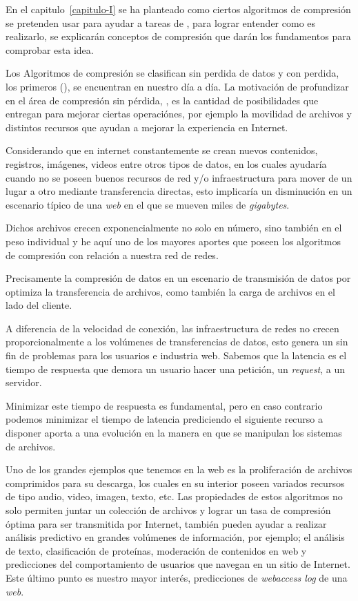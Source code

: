 

En el capitulo~\ref{capitulo-I} se ha planteado como ciertos algoritmos de compresión se pretenden usar para ayudar a tareas de \machinelearning, para lograr entender como es realizarlo, se explicarán conceptos de compresión que darán los fundamentos para comprobar esta idea.



Los Algoritmos de compresión se clasifican sin perdida de datos y con perdida, los primeros \losslessdatacompression(\LDC), se encuentran en nuestro día a día. La motivación de profundizar en el área de compresión sin pérdida, \LDC, es la cantidad de posibilidades que entregan para mejorar ciertas  operaciónes, por ejemplo la  movilidad de archivos y distintos recursos que ayudan a mejorar la experiencia en Internet. 


Considerando que en internet constantemente se crean nuevos contenidos, registros, imágenes, videos entre otros tipos de datos, en los cuales ayudaría cuando no se poseen buenos recursos de red y/o infraestructura para mover de un lugar a otro mediante  transferencia directas, esto implicaría un disminución en un escenario típico de una \emph{web} en el que se mueven miles de \emph{gigabytes}. 

Dichos archivos crecen exponencialmente no solo en número, sino también en el peso individual y he aquí uno de los mayores aportes que poseen los algoritmos de compresión con relación a nuestra red de redes. 

Precisamente la compresión de datos en un escenario de transmisión de datos por \inet optimiza la transferencia de archivos, como también la carga de archivos en el lado del cliente.


A diferencia de la velocidad de conexión, las infraestructura de redes no crecen proporcionalmente a los volúmenes de transferencias de datos, esto genera un sin fin de problemas para los usuarios e industria web. Sabemos que la latencia es el tiempo de respuesta que demora un usuario hacer una petición, un \emph{request}, a un servidor. 


Minimizar este tiempo de respuesta es fundamental, pero en caso contrario podemos minimizar el tiempo de latencia prediciendo el siguiente recurso a disponer aporta a una evolución en la manera en que se manipulan los sistemas de archivos.
 
Uno de los grandes ejemplos que tenemos en la web es la proliferación de archivos comprimidos para su descarga, los cuales en su interior poseen variados recursos de tipo audio, video, imagen, texto, etc. Las propiedades de estos algoritmos no solo permiten juntar un colección de archivos y lograr un tasa de compresión óptima para ser transmitida por Internet, también pueden ayudar a realizar análisis predictivo en grandes volúmenes de información, por ejemplo; el análisis de texto, clasificación de proteínas, moderación de contenidos en web y predicciones del comportamiento de usuarios que navegan en un sitio de Internet. Este último punto es nuestro mayor interés,  predicciones de \emph{webaccess log} de una \emph{web}. 

